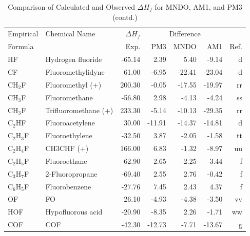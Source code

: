 \begin{table}
\caption{Comparison of Calculated and Observed $\Delta H_f$ 
for MNDO, AM1, and PM3 (contd.)}
\begin{center}
\compresstable
\begin{tabular}{llrrrrr}
Empirical & Chemical Name & $\Delta H_f$ & \multicolumn{3}{c}{Difference} & \\
Formula   &               & Exp. & PM3 &  MNDO  &  AM1 &     Ref.\\
\hline
 HF          & Hydrogen fluoride               &   -65.14    &     2.39  &     5.40  &    -9.14  &      d\\
 CF          & Fluoromethylidyne               &    61.00    &    -6.95  &   -22.41  &   -23.04  &      d\\
 CH$_2$F        & Fluoromethyl (+)                &   200.30    &    -0.05  &   -17.55  &   -19.97  &     rr\\
 CH$_3$F        & Fluoromethane                   &   -56.80    &     2.98  &    -4.13  &    -4.24  &     ss\\
 CH$_3$F        & Trifluoromethane (+)            &   233.30    &    -5.14  &   -10.13  &   -29.35  &     rr\\
 C$_2$HF        & Fluoroacetylene                 &    30.00    &   -11.91  &   -14.37  &   -14.81  &      d\\
 C$_2$H$_3$F       & Fluoroethylene                  &   -32.50    &     3.87  &    -2.05  &    -1.58  &     tt\\
 C$_2$H$_4$F       & CH3CHF (+)                      &   166.00    &     6.83  &    -1.32  &    -8.97  &     uu\\
 C$_2$H$_5$F       & Fluoroethane                    &   -62.90    &     2.65  &    -2.25  &    -3.44  &      f\\
 C$_3$H$_7$F       & 2-Fluoropropane                 &   -69.40    &     2.55  &     2.76  &    -0.42  &      f\\
 C$_6$H$_5$F       & Fluorobenzene                   &   -27.76    &     7.45  &     2.43  &     4.37  &      f\\
 OF          & FO                              &    26.10    &    -4.93  &    -4.38  &    -3.50  &     vv\\
 HOF         & Hypofluorous acid               &   -20.90    &    -8.35  &     2.26  &    -1.71  &     ww\\
 COF         & COF                             &   -42.30    &   -12.73  &    -7.71  &   -13.67  &      g\\

\end{tabular}
\end{center}
\end{table}
